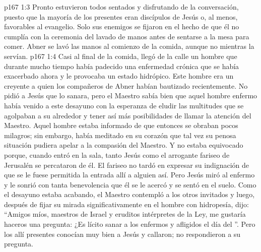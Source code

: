 \vs p167 1:3 Pronto estuvieron todos sentados y disfrutando de la conversación, puesto que la mayoría de los presentes eran discípulos de Jesús o, al menos, favorables al evangelio. Solo sus enemigos se fijaron en el hecho de que él no cumplía con la ceremonia del lavado de manos antes de sentarse a la mesa para comer. Abner se lavó las manos al comienzo de la comida, aunque no mientras la servían.
\vs p167 1:4 Casi al final de la comida, llegó de la calle un hombre que durante mucho tiempo había padecido una enfermedad crónica que se había exacerbado ahora y le provocaba un estado hidrópico. Este hombre era un creyente a quien los compañeros de Abner habían bautizado recientemente. No pidió a Jesús que lo sanara, pero el Maestro sabía bien que aquel hombre enfermo había venido a este desayuno con la esperanza de eludir las multitudes que se agolpaban a su alrededor y tener así más posibilidades de llamar la atención del Maestro. Aquel hombre estaba informado de que entonces se obraban pocos milagros; sin embargo, había meditado en su corazón que tal vez su penosa situación pudiera apelar a la compasión del Maestro. Y no estaba equivocado porque, cuando entró en la sala, tanto Jesús como el arrogante fariseo de Jerusalén se percataron de él. El fariseo no tardó en expresar su indignación de que se le fuese permitida la entrada allí a alguien así. Pero Jesús miró al enfermo y le sonrió con tanta benevolencia que él se le acercó y se sentó en el suelo. Como el desayuno estaba acabando, el Maestro contempló a los otros invitados y luego, después de fijar su mirada significativamente en el hombre con hidropesía, dijo: “Amigos míos, maestros de Israel y eruditos intérpretes de la Ley, me gustaría haceros una pregunta: ¿Es lícito sanar a los enfermos y afligidos el día del ”. Pero los allí presentes conocían muy bien a Jesús y callaron; no respondieron a su pregunta.
